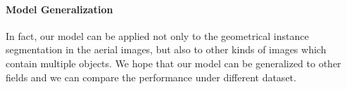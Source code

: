 \paragraph{Model Generalization}
In fact, our model can be applied not only to the geometrical instance segmentation in the aerial images, but also to other kinds of images which contain multiple objects. We hope that our model \modelnameshort can be generalized to other fields and we can compare the performance under different dataset.

